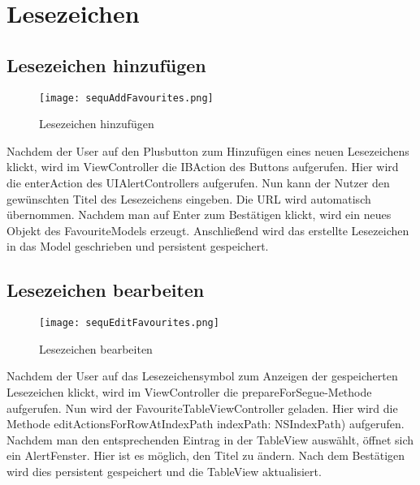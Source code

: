 \section{Lesezeichen}
\subsection{Lesezeichen hinzufügen}

\begin{figure}[h]
	\centering
	\texttt{[image: sequAddFavourites.png]}
	\caption{Lesezeichen hinzufügen}
		\label{fig:Lesezeichen hinzufuegen}
\end{figure}
Nachdem der User auf den Plusbutton zum Hinzufügen eines neuen Lesezeichens klickt, wird im ViewController die IBAction des Buttons aufgerufen. Hier wird die enterAction des UIAlertControllers aufgerufen. Nun kann der Nutzer den gewünschten Titel des Lesezeichens eingeben. Die URL wird automatisch übernommen. Nachdem man auf Enter zum Bestätigen klickt, wird ein neues Objekt des FavouriteModels erzeugt. Anschließend wird das erstellte Lesezeichen in das Model geschrieben und persistent gespeichert.


\subsection{Lesezeichen bearbeiten}
\begin{figure}[h]
	\centering
	\texttt{[image: sequEditFavourites.png]}
	\caption{Lesezeichen bearbeiten}
	\label{fig: Lesezeichen bearbeiten}
\end{figure}
Nachdem der User auf das Lesezeichensymbol zum Anzeigen der gespeicherten Lesezeichen klickt, wird im ViewController die prepareForSegue-Methode aufgerufen. Nun wird der FavouriteTableViewController geladen. Hier wird die Methode editActionsForRowAtIndexPath indexPath: NSIndexPath) aufgerufen. Nachdem man den entsprechenden Eintrag in der TableView auswählt, öffnet sich ein AlertFenster. Hier ist es möglich, den Titel zu ändern. Nach dem Bestätigen wird dies persistent gespeichert und die TableView aktualisiert.


